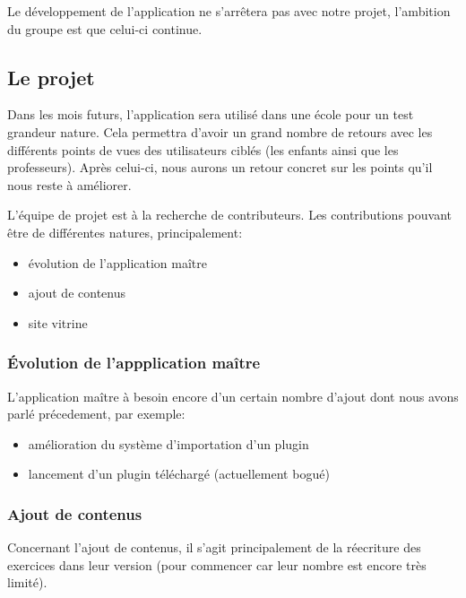 Le développement de l'application ne s'arrêtera pas avec notre projet, l'ambition du groupe est que celui-ci continue.


\subsection{Le projet}
Dans les mois futurs, l'application sera utilisé dans une école pour un test grandeur nature. 
Cela permettra d'avoir un grand nombre de retours avec les différents points de vues des utilisateurs ciblés (les enfants ainsi que les professeurs). 
Après celui-ci, nous aurons un retour concret sur les points qu'il nous reste à améliorer.




L'équipe de projet est à la recherche de contributeurs. Les contributions pouvant être de différentes natures, principalement:
\begin{itemize}
    \item évolution de l'application maître
    \item ajout de contenus
    \item site vitrine
\end{itemize}

\subsubsection{\'{E}volution de l'appplication maître}
L'application maître à besoin encore d'un certain nombre d'ajout dont nous avons parlé précedement, par exemple:
\begin{itemize}
    \item amélioration du système d'importation d'un plugin
    \item lancement d'un plugin téléchargé (actuellement bogué)
\end{itemize}

\subsubsection{Ajout de contenus}
Concernant l'ajout de contenus, il s'agit principalement de la réecriture des exercices dans leur version \android{} (pour commencer car leur nombre est encore très limité).


